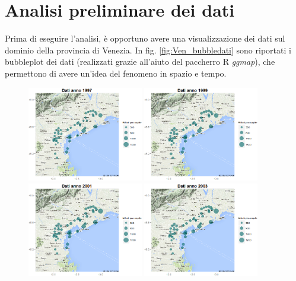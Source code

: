 \documentclass[a4paper,11pt,twoside,openright]{book}							%
\begin{document}
\section{Analisi preliminare dei dati}
Prima di eseguire l'analisi, è opportuno avere una visualizzazione dei dati sul dominio della provincia di Venezia. In fig. \ref{fig:Ven_bubbledati} sono riportati i bubbleplot dei dati (realizzati grazie all'aiuto del paccherro R \textit{ggmap}), che permettono di avere un'idea del fenomeno in spazio e tempo.
\newpage
\begin{figure}[H]
	\centering
	\includegraphics[trim=0cm 0cm 0cm 0cm,clip=true,width=0.45\textwidth]{Immagini/venezia_dati/Dati1997.png}
	\includegraphics[trim=0cm 0cm 0cm 0cm,clip=true,width=0.45\textwidth]{Immagini/venezia_dati/Dati1999.png}
	\includegraphics[trim=0cm 0cm 0cm 0cm,clip=true,width=0.45\textwidth]{Immagini/venezia_dati/Dati2001.png}
	\includegraphics[trim=0cm 0cm 0cm 0cm,clip=true,width=0.45\textwidth]{Immagini/venezia_dati/Dati2003.png}

\end{figure}
\end{document}
